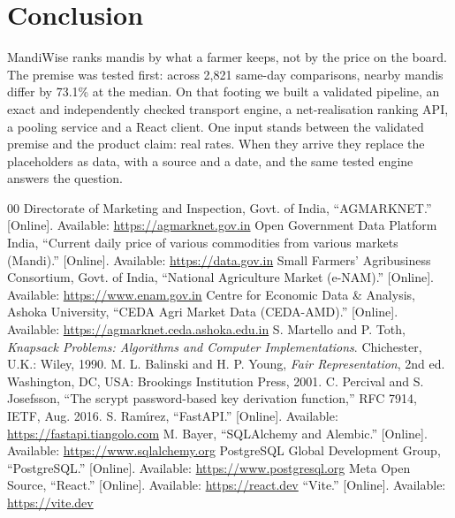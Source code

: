 \documentclass[conference]{IEEEtran}
\begin{document}
\section{Conclusion}
\label{sec:conclusion}
MandiWise ranks mandis by what a farmer keeps, not by the price on the
board. The premise was tested first: across 2,821 same-day comparisons,
nearby mandis differ by 73.1\% at the median. On that footing we built a
validated pipeline, an exact and independently checked transport engine,
a net-realisation ranking API, a pooling service and a React client. One
input stands between the validated premise and the product claim: real
rates. When they arrive they replace the placeholders as data, with a
source and a date, and the same tested engine answers the question.

\begin{thebibliography}{00}
Directorate of Marketing and Inspection, Govt. of India, ``AGMARKNET.''
[Online]. Available: \url{https://agmarknet.gov.in}
Open Government Data Platform India, ``Current daily price of various
commodities from various markets (Mandi).'' [Online]. Available:
\url{https://data.gov.in}
Small Farmers' Agribusiness Consortium, Govt. of India, ``National
Agriculture Market (e-NAM).'' [Online]. Available:
\url{https://www.enam.gov.in}
Centre for Economic Data \& Analysis, Ashoka University, ``CEDA Agri
Market Data (CEDA-AMD).'' [Online]. Available:
\url{https://agmarknet.ceda.ashoka.edu.in}
S. Martello and P. Toth, \textit{Knapsack Problems: Algorithms and
Computer Implementations}. Chichester, U.K.: Wiley, 1990.
M. L. Balinski and H. P. Young, \textit{Fair Representation}, 2nd ed.
Washington, DC, USA: Brookings Institution Press, 2001.
C. Percival and S. Josefsson, ``The scrypt password-based key derivation
function,'' RFC 7914, IETF, Aug. 2016.
S. Ram\'{\i}rez, ``FastAPI.'' [Online]. Available:
\url{https://fastapi.tiangolo.com}
M. Bayer, ``SQLAlchemy and Alembic.'' [Online]. Available:
\url{https://www.sqlalchemy.org}
PostgreSQL Global Development Group, ``PostgreSQL.'' [Online]. Available:
\url{https://www.postgresql.org}
Meta Open Source, ``React.'' [Online]. Available: \url{https://react.dev}
``Vite.'' [Online]. Available: \url{https://vite.dev}
\end{thebibliography}
\end{document}
